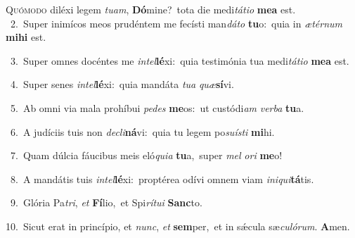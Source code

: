 \lettrine{\initial\textcolor{\initialcolor}{Q}}{uómodo} diléxi legem \textit{tu}\-\textit{am}, \textbf{Dó}\-mine?~\star tota die medi\-\textit{tá}\-\textit{ti}\textit{o} \textbf{me}\-\textbf{a} est.\\
{\numbfont\textcolor{\numbcolor}{~2.}}~Super inimícos meos prudéntem me fecísti man\-\textit{dá}\-\textit{to} \textbf{tu}\-o:~\star quia in \textit{æ}\-\textit{tér}\textit{num} \textbf{mi}\-\textbf{hi} est.\par
{\numbfont\textcolor{\numbcolor}{~3.}}~Super omnes docéntes me \textit{in}\-\textit{tel}\textbf{lé}xi:~\star quia testimónia tua medi\-\textit{tá}\-\textit{ti}\textit{o} \textbf{me}\-\textbf{a} est.\par
{\numbfont\textcolor{\numbcolor}{~4.}}~Super senes \textit{in}\-\textit{tel}\textbf{lé}xi:~\star quia mandáta \textit{tu}\-\textit{a} \textit{quæ}\-\textbf{sí}vi.\par
{\numbfont\textcolor{\numbcolor}{~5.}}~Ab omni via mala prohíbui \textit{pe}\-\textit{des} \textbf{me}\-os:~\star ut custódi\textit{am} \textit{ver}\-\textit{ba} \textbf{tu}\-a.\par
{\numbfont\textcolor{\numbcolor}{~6.}}~A judíciis tuis non \textit{de}\-\textit{cli}\textbf{ná}vi:~\star quia tu legem po\-\textit{su}\-\textit{ís}\textit{ti} \textbf{mi}\-hi.\par
{\numbfont\textcolor{\numbcolor}{~7.}}~Quam dúlcia fáucibus meis eló\-\textit{qui}\-\textit{a} \textbf{tu}\-a,~\star super \textit{mel} \textit{o}\-\textit{ri} \textbf{me}\-o!\par
{\numbfont\textcolor{\numbcolor}{~8.}}~A mandátis tuis \textit{in}\-\textit{tel}\textbf{lé}xi:~\star proptérea odívi omnem viam \textit{in}\-\textit{i}\textit{qui}\textbf{tá}tis.\par
{\numbfont\textcolor{\numbcolor}{~9.}}~Glória Pa\-\textit{tri}\-, \textit{et} \textbf{Fí}\-lio,~\star et Spi\-\textit{rí}\-\textit{tu}\textit{i} \textbf{Sanc}\-to.\par
{\numbfont\textcolor{\numbcolor}{10.}}~Sicut erat in princípio, et \textit{nunc}\-, \textit{et} \textbf{sem}\-per,~\star et in sǽcula sæ\-\textit{cu}\-\textit{ló}\textit{rum}. \textbf{A}\-men.\par
